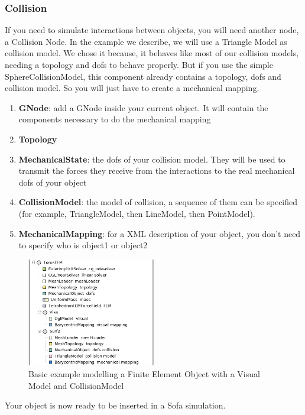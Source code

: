 \subsubsection{Collision}
If you need to simulate interactions between objects, you will need another node, a Collision Node.
In the example we describe, we will use a Triangle Model as collision model. We chose it because, it behaves like most of our collision models, needing a topology and dofs to behave properly. But if you use the simple SphereCollisionModel, this component already contains a topology, dofs and collision model. So you will just have to create a mechanical mapping.
\begin{enumerate}
 \item { \bf GNode}: add a GNode inside your current object. It will contain the components necessary to do the mechanical mapping
 \item { \bf Topology}
 \item { \bf MechanicalState}: the dofs of your collision model. They will be used to transmit the forces they receive from the interactions to the real mechanical dofs of your object
 \item { \bf CollisionModel}: the model of collision, a sequence of them can be specified (for example, TriangleModel, then LineModel, then PointModel).
 \item { \bf MechanicalMapping}: for a XML description of your object, you don't need to specify who is object1 or object2
\end{enumerate}

\begin{figure}[htpb]
	\centering
		\includegraphics[width=0.5\textwidth]{Modelling2.jpg}
	\caption{Basic example modelling a Finite Element Object with a Visual Model and CollisionModel}
\end{figure}

Your object is now ready to be inserted in a Sofa simulation.

